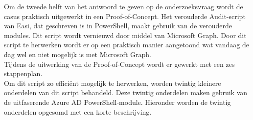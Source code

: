 Om de tweede helft van het antwoord te geven op de onderzoeksvraag wordt de casus praktisch uitgewerkt in een Proof-of-Concept. Het verouderde Audit-script van Easi, dat geschreven is in PowerShell, maakt gebruik van de verouderde modules. Dit script wordt vernieuwd door middel van Microsoft Graph. Door dit script te herwerken wordt er op een praktisch manier aangetoond wat vandaag de dag wel en niet mogelijk is met Microsoft Graph. \\

Tijdens de uitwerking van de Proof-of-Concept wordt er gewerkt met een zes stappenplan. \\

Om dit script zo efficiënt mogelijk te herwerken, worden twintig kleinere onderdelen van dit script behandeld. Deze twintig onderdelen maken gebruik van de uitfaserende Azure \ac{AD} PowerShell-module. Hieronder worden de twintig onderdelen opgesomd met een korte beschrijving. 

